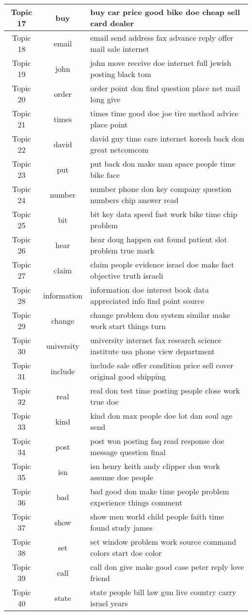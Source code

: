 \documentclass{article}
\begin{document}
\begin{table}[h]
\begin{center}
\begin{tabular}{|c|c|l|}
Topic	17	&	buy & buy car price good bike doe cheap sell card dealer	\\ \hline
Topic	18	&	email & email send address fax advance reply offer mail sale internet	\\ \hline
Topic	19	&	john & john move receive doe internet full jewish posting black tom	\\ \hline
Topic	20	&	order & order point don find question place net mail long give	\\ \hline
Topic	21	&	times & times time good doe joe tire method advice place point	\\ \hline
Topic	22	&	david & david guy time care internet koresh back don great netcomcom	\\ \hline
Topic	23	&	put & put back don make man space people time bike face	\\ \hline
Topic	24	&	number & number phone don key company question numbers chip answer read	\\ \hline
Topic	25	&	bit & bit key data speed fast work bike time chip problem	\\ \hline
Topic	26	&	hear & hear doug happen eat found patient slot problem true mark	\\ \hline
Topic	27	&	claim & claim people evidence israel doe make fact objective truth israeli	\\ \hline
Topic	28	&	information & information doe interest book data appreciated info find point source	\\ \hline
Topic	29	&	change & change problem don system similar make work start things turn	\\ \hline
Topic	30	&	university & university internet fax research science institute usa phone view department	\\ \hline
Topic	31	&	include & include sale offer condition price sell cover original good shipping	\\ \hline
Topic	32	&	real & real don test time posting people close work true doe	\\ \hline
Topic	33	&	kind & kind don max people doe lot dan soul age send	\\ \hline
Topic	34	&	post & post won posting faq read response doe message question final	\\ \hline
Topic	35	&	isn & isn henry keith andy clipper don work assume doe people	\\ \hline
Topic	36	&	bad & bad good don make time people problem experience things comment	\\ \hline
Topic	37	&	show & show men world child people faith time found study james	\\ \hline
Topic	38	&	set & set window problem work source command colors start doe color	\\ \hline
Topic	39	&	call & call don give make good case peter reply love friend	\\ \hline
Topic	40	&	state & state people bill law gun live country carry israel years	\\ \hline




\end{tabular}
\end{center}
\end{table}
\end{document}
